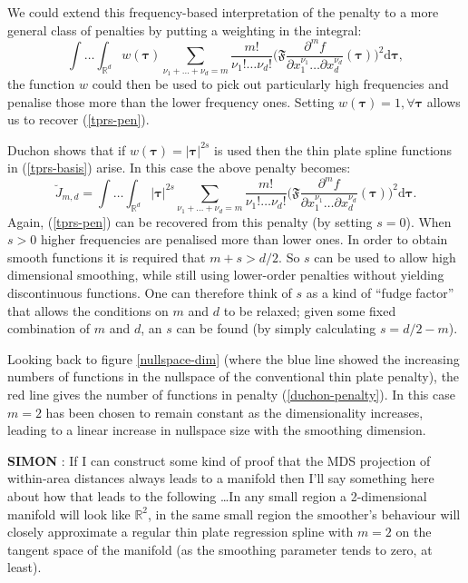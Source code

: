 We could extend this frequency-based interpretation of the penalty to a more general class of penalties by putting a weighting in the integral:
\begin{equation}
\int \ldots \int_{\mathbb{R}^d} w(\boldsymbol{\tau}) \sum_{\nu_1 + \dots + \nu_d=m} \frac{m!}{\nu_1! \dots \nu_d!}\Big( \mathfrak{F} \frac{\partial^m f}{\partial x_1^{\nu_1} \ldots  \partial x_d^{\nu_d}}(\boldsymbol{\tau}) \Big)^2 \text{d} \boldsymbol{\tau},
\label{duchon-penalty-general}
\end{equation}
the function $w$ could then be used to pick out particularly high frequencies and penalise those more than the lower frequency ones. Setting $w(\boldsymbol{\tau})=1, \forall \boldsymbol{\tau}$ allows us to recover (\ref{tprs-pen}).

Duchon shows that if $w(\boldsymbol{\tau})= \lvert \boldsymbol{\tau} \rvert^{2s}$ is used then the thin plate spline functions in (\ref{tprs-basis}) arise. In this case the above penalty becomes:
\begin{equation}
\breve{J}_{m,d} = \int \ldots \int_{\mathbb{R}^d} \lvert \boldsymbol{\tau} \rvert^{2s} \sum_{\nu_1 + \dots + \nu_d=m} \frac{m!}{\nu_1! \dots \nu_d!}\Big( \mathfrak{F} \frac{\partial^m f}{\partial x_1^{\nu_1} \ldots  \partial x_d^{\nu_d}}(\boldsymbol{\tau}) \Big)^2 \text{d} \boldsymbol{\tau}.
\label{duchon-penalty}
\end{equation}
Again, (\ref{tprs-pen}) can be recovered from this penalty (by setting $s=0$). When $s>0$ higher frequencies are penalised more than lower ones. In order to obtain smooth functions it is required that $m+s>d/2$. So $s$ can be used to allow high dimensional smoothing, while still using lower-order penalties without yielding discontinuous functions. One can therefore think of $s$ as a kind of ``fudge factor'' that allows the conditions on $m$ and $d$ to be relaxed; given some fixed combination of $m$ and $d$, an $s$ can be found (by simply calculating $s=d/2-m$).

Looking back to figure \ref{nullspace-dim} (where the blue line showed the increasing numbers of functions in the nullspace of the conventional thin plate penalty), the red line gives the number of functions in penalty (\ref{duchon-penalty}). In this case $m=2$ has been chosen to remain constant as the dimensionality increases, leading to a linear increase in nullspace size with the smoothing dimension.

\textbf{SIMON} : If I can construct some kind of proof that the MDS projection of within-area distances always leads to a manifold then I'll say something here about how that leads to the following \ldots In any small region a 2-dimensional manifold will look like $\mathbb{R}^2$, in the same small region the smoother's behaviour will closely approximate a regular thin plate regression spline with $m=2$ on the tangent space of the manifold (as the smoothing parameter tends to zero, at least).

